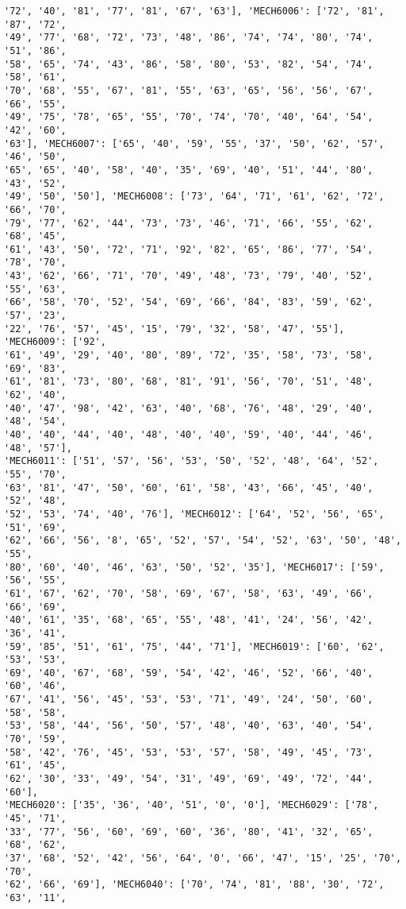 \documentclass[11pt]{article}
\begin{document}
\begin{Verbatim}[commandchars=\\\{\}]
'72', '40', '81', '77', '81', '67', '63'], 'MECH6006': ['72', '81', '87', '72',
'49', '77', '68', '72', '73', '48', '86', '74', '74', '80', '74', '51', '86',
'58', '65', '74', '43', '86', '58', '80', '53', '82', '54', '74', '58', '61',
'70', '68', '55', '67', '81', '55', '63', '65', '56', '56', '67', '66', '55',
'49', '75', '78', '65', '55', '70', '74', '70', '40', '64', '54', '42', '60',
'63'], 'MECH6007': ['65', '40', '59', '55', '37', '50', '62', '57', '46', '50',
'65', '65', '40', '58', '40', '35', '69', '40', '51', '44', '80', '43', '52',
'49', '50', '50'], 'MECH6008': ['73', '64', '71', '61', '62', '72', '66', '70',
'79', '77', '62', '44', '73', '73', '46', '71', '66', '55', '62', '68', '45',
'61', '43', '50', '72', '71', '92', '82', '65', '86', '77', '54', '78', '70',
'43', '62', '66', '71', '70', '49', '48', '73', '79', '40', '52', '55', '63',
'66', '58', '70', '52', '54', '69', '66', '84', '83', '59', '62', '57', '23',
'22', '76', '57', '45', '15', '79', '32', '58', '47', '55'], 'MECH6009': ['92',
'61', '49', '29', '40', '80', '89', '72', '35', '58', '73', '58', '69', '83',
'61', '81', '73', '80', '68', '81', '91', '56', '70', '51', '48', '62', '40',
'40', '47', '98', '42', '63', '40', '68', '76', '48', '29', '40', '48', '54',
'40', '40', '44', '40', '48', '40', '40', '59', '40', '44', '46', '48', '57'],
'MECH6011': ['51', '57', '56', '53', '50', '52', '48', '64', '52', '55', '70',
'63', '81', '47', '50', '60', '61', '58', '43', '66', '45', '40', '52', '48',
'52', '53', '74', '40', '76'], 'MECH6012': ['64', '52', '56', '65', '51', '69',
'62', '66', '56', '8', '65', '52', '57', '54', '52', '63', '50', '48', '55',
'80', '60', '40', '46', '63', '50', '52', '35'], 'MECH6017': ['59', '56', '55',
'61', '67', '62', '70', '58', '69', '67', '58', '63', '49', '66', '66', '69',
'40', '61', '35', '68', '65', '55', '48', '41', '24', '56', '42', '36', '41',
'59', '85', '51', '61', '75', '44', '71'], 'MECH6019': ['60', '62', '53', '53',
'69', '40', '67', '68', '59', '54', '42', '46', '52', '66', '40', '60', '46',
'67', '41', '56', '45', '53', '53', '71', '49', '24', '50', '60', '58', '58',
'53', '58', '44', '56', '50', '57', '48', '40', '63', '40', '54', '70', '59',
'58', '42', '76', '45', '53', '53', '57', '58', '49', '45', '73', '61', '45',
'62', '30', '33', '49', '54', '31', '49', '69', '49', '72', '44', '60'],
'MECH6020': ['35', '36', '40', '51', '0', '0'], 'MECH6029': ['78', '45', '71',
'33', '77', '56', '60', '69', '60', '36', '80', '41', '32', '65', '68', '62',
'37', '68', '52', '42', '56', '64', '0', '66', '47', '15', '25', '70', '70',
'62', '66', '69'], 'MECH6040': ['70', '74', '81', '88', '30', '72', '63', '11',

\end{Verbatim}
\end{document}
